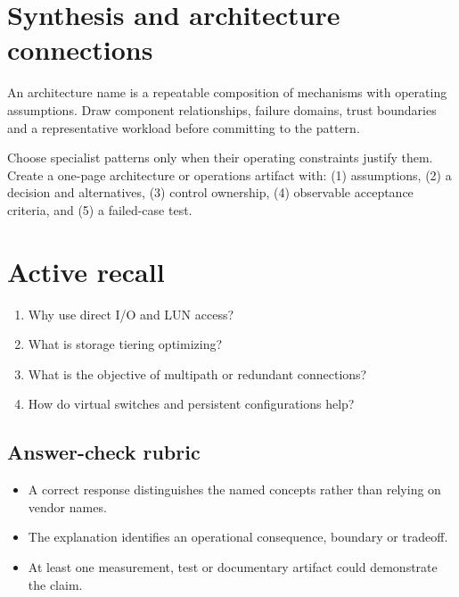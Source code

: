 \documentclass[10pt,letterpaper]{article}
\begin{document}
\section{Synthesis and architecture connections}
An architecture name is a repeatable composition of mechanisms with operating assumptions. Draw component relationships, failure domains, trust boundaries and a representative workload before committing to the pattern.
\begin{workbox}[title={Applied deliverable}]
Choose specialist patterns only when their operating constraints justify them.\\[4pt]Create a one-page architecture or operations artifact with: (1) assumptions, (2) a decision and alternatives, (3) control ownership, (4) observable acceptance criteria, and (5) a failed-case test.
\end{workbox}
\section{Active recall}
\begin{enumerate}
\item Why use direct I/O and LUN access?
\item What is storage tiering optimizing?
\item What is the objective of multipath or redundant connections?
\item How do virtual switches and persistent configurations help?
\end{enumerate}
\subsection{Answer-check rubric}
\begin{itemize}
\item A correct response distinguishes the named concepts rather than relying on vendor names.
\item The explanation identifies an operational consequence, boundary or tradeoff.
\item At least one measurement, test or documentary artifact could demonstrate the claim.
\end{itemize}
\end{document}
